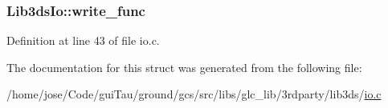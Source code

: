 \hypertarget{struct_lib3ds_io_adacf811077618a867308677993f5bbb6}{
\subsubsection[{write\-\_\-func}]{ Lib3ds\-Io\-::write\-\_\-func}}\label{struct_lib3ds_io_adacf811077618a867308677993f5bbb6}


Definition at line 43 of file io.\-c.



The documentation for this struct was generated from the following file\-:\begin{DoxyCompactItemize}
\item 
/home/jose/\-Code/gui\-Tau/ground/gcs/src/libs/glc\-\_\-lib/3rdparty/lib3ds/\hyperlink{io_8c}{io.\-c}\end{DoxyCompactItemize}

